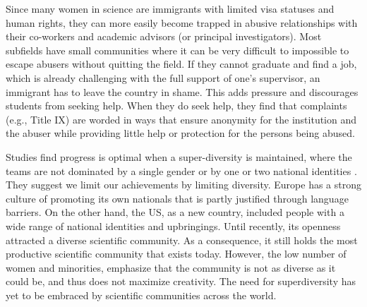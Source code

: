 \documentclass[utf8]{frontiersSCNS} %
\begin{document}
Since many women in science are immigrants with limited visa statuses and human rights, they can more easily become trapped in abusive relationships with their co-workers and academic advisors (or principal investigators). Most subfields have small communities where it can be very difficult to impossible to escape abusers without quitting the field. If they cannot graduate and find a job, which is already challenging with the full support of one's supervisor, an immigrant has to leave the country in shame. This adds pressure and discourages students from seeking help. When they do seek help, they find that complaints (e.g., Title IX) are worded in ways that ensure anonymity for the institution and the abuser while providing little help or protection for the persons being abused.

 Studies find progress is optimal when a super-diversity is maintained, where the teams are not dominated by a single gender or by one or two national identities \citep{page2007making}. They suggest we limit our achievements by limiting diversity. Europe has a strong culture of promoting its own nationals that is partly justified through language barriers. On the other hand, the US, as a new country, included people with a wide range of national identities and  upbringings. Until recently, its openness attracted a diverse scientific community. As a consequence, it still holds the most productive scientific community that exists today. However, the low number of women and minorities, emphasize that the community is not as diverse as it could be, and thus does not maximize creativity. The need for superdiversity has yet to be embraced by scientific communities across the world. %



 
\end{document}
